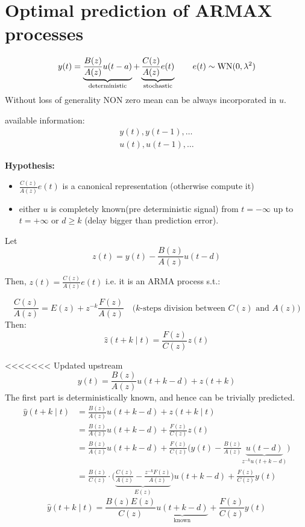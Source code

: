 \section{Optimal prediction of ARMAX processes}

\[
	y(t)=\underbrace{\frac{B(z)}{A(z)} u(t-a)}_{\text{deterministic}}+
	\underbrace{\frac{C(z)}{A(z)} e(t)}_{\text{stochastic}}\qquad e(t)\sim \operatorname{WN}(0,\lambda^2 )
\]
Without loss of generality NON zero mean can be always incorporated in $u$.

available information:
\begin{gather*}
	y(t),y(t-1),\ldots \\
	u(t),u(t-1),\ldots
\end{gather*}

\textbf{Hypothesis:}
\begin{itemize}
	\item $\frac{C(z)}{A(z)}e(t)$  is a canonical representation (otherwise compute it)
	\item either $u$ is completely known(pre deterministic signal) from $t=-\infty$ up to $t=+\infty$ or $d\geq k$ (delay bigger than prediction error).
\end{itemize}

Let 
$$
	z(t)=y(t)-\frac{B(z)}{A(z)} u(t-d)
$$

Then, $z(t)=\frac{C(z)}{A(z)} e(t)$ i.e. it is an ARMA process s.t.:

$$
	\frac{C(z)}{A(z)}=E(z)+z^{-k} \frac{F(z)}{A(z)} \quad\text{($k$-steps division between $C(z)$ and $A(z)$)}
$$
Then:
$$
	\hat{z}(t+k \mid t)=\frac{F(z)}{C(z)} z(t)
$$

<<<<<<< Updated upstream
$$
	y(t)=\frac{B(z)}{A(z)} u(t+k-d)+z(t+k)
$$
The first part is deterministically known, and hence can be trivially predicted.
\begin{align*}
	\hat{y}(t+k \mid t)&=\frac{B(z)}{A(z)} u(t+k-d)+z(t+k \mid t) \\
	&=\frac{B(z)}{A(z)} u(t+k-d)+\frac{F(z)}{C(z)} z(t) \\
	& =\frac{B(z)}{A(z)} u(t+k-d)+\frac{F(z)}{C(z)}\Bigg(y(t)-\frac{B(z)}{A(z)} \underbrace{u(t-d)}_{z^{-k}u(t+k-d)}\Bigg) \\
	&=\frac{B(z)}{C(z)} \cdot\Bigg(\underbrace{\frac{C(z)}{A(z)}-\frac{z^{-k} F(z)}{A(z)}}_{E(z)}\Bigg) u(t+k-d)+\frac{F(z)}{C(z)} y(t)
\end{align*}
$$
	\hat{y}(t+k \mid t) =\frac{B(z) E(z)}{C(z)} \underbrace{u(t+k-d)}_{\text{known}}+\frac{F(z)}{C(z)} y(t)
$$

